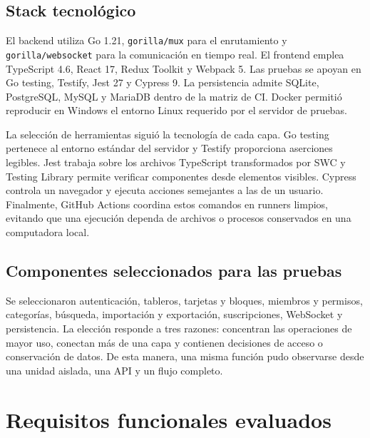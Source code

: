 \documentclass[conference]{IEEEtran}
\begin{document}
\subsection{Stack tecnológico}
El backend utiliza Go 1.21, \texttt{gorilla/mux} para el enrutamiento y \texttt{gorilla/websocket} para la comunicación en tiempo real. El frontend emplea TypeScript 4.6, React 17, Redux Toolkit y Webpack 5. Las pruebas se apoyan en Go testing, Testify, Jest 27 y Cypress 9. La persistencia admite SQLite, PostgreSQL, MySQL y MariaDB dentro de la matriz de CI. Docker permitió reproducir en Windows el entorno Linux requerido por el servidor de pruebas.

La selección de herramientas siguió la tecnología de cada capa. Go testing pertenece al entorno estándar del servidor y Testify proporciona aserciones legibles. Jest trabaja sobre los archivos TypeScript transformados por SWC y Testing Library permite verificar componentes desde elementos visibles. Cypress controla un navegador y ejecuta acciones semejantes a las de un usuario. Finalmente, GitHub Actions coordina estos comandos en runners limpios, evitando que una ejecución dependa de archivos o procesos conservados en una computadora local.
\vspace{\baselineskip}

\subsection{Componentes seleccionados para las pruebas}
Se seleccionaron autenticación, tableros, tarjetas y bloques, miembros y permisos, categorías, búsqueda, importación y exportación, suscripciones, WebSocket y persistencia. La elección responde a tres razones: concentran las operaciones de mayor uso, conectan más de una capa y contienen decisiones de acceso o conservación de datos. De esta manera, una misma función pudo observarse desde una unidad aislada, una API y un flujo completo.
\vspace{\baselineskip}

\section{Requisitos funcionales evaluados}

\end{document}
